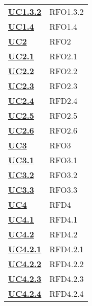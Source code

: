 \begin{longtable}[H]{| >{\centering\bfseries}p{8cm} | >{\centering\arraybackslash}p{8cm} |}
    \hyperref[par:uc1.3.2]{UC1.3.2} & RFO1.3.2 \\

    \hyperref[ssub:uc1.4]{UC1.4} & RFO1.4 \\



    \hyperref[sub:uc2]{UC2} &  RFO2\\

    \hyperref[ssub:uc2.1]{UC2.1} & RFO2.1 \\

    \hyperref[ssub:uc2.2]{UC2.2} & RFO2.2 \\

    \hyperref[ssub:uc2.3]{UC2.3} & RFO2.3 \\

    \hyperref[ssub:uc2.4]{UC2.4} & RFD2.4 \\

    \hyperref[ssub:uc2.5]{UC2.5} & RFO2.5 \\

    \hyperref[ssub:uc2.6]{UC2.6} & RFO2.6 \\



    \hyperref[sub:uc3]{UC3} & RFO3 \\

    \hyperref[ssub:uc3.1]{UC3.1} & RFO3.1 \\

    \hyperref[ssub:uc3.2]{UC3.2} & RFO3.2 \\

    \hyperref[ssub:uc3.3]{UC3.3} & RFO3.3 \\




    \hyperref[sub:uc4]{UC4} & RFD4 \\

    \hyperref[ssub:uc4.1]{UC4.1} & RFD4.1 \\

    \hyperref[ssub:uc4.2]{UC4.2} & RFD4.2 \\

    \hyperref[par:uc4.2.1]{UC4.2.1} & RFD4.2.1 \\

    \hyperref[par:uc4.2.2]{UC4.2.2} & RFD4.2.2 \\

    \hyperref[par:uc4.2.3]{UC4.2.3}  & RFD4.2.3 \\

    \hyperref[par:uc4.2.4]{UC4.2.4} & RFD4.2.4 \\


\end{longtable}
